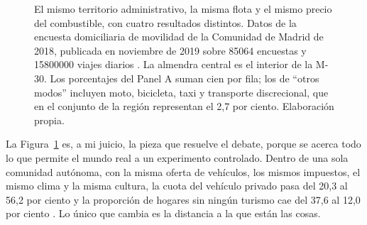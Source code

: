 \documentclass[11pt,letterpaper]{article}
\begin{document}
\begin{figure}[ht]
  \caption{El mismo territorio administrativo, la misma flota y el mismo
  precio del combustible, con cuatro resultados distintos. Datos de la encuesta
  domiciliaria de movilidad de la Comunidad de Madrid de 2018, publicada en
  noviembre de 2019 sobre \num{85064} encuestas y \num{15800000} viajes diarios
  \parencite{crtm2019}. La almendra central es el interior de la M-30. Los
  porcentajes del Panel A suman cien por fila; los de \enquote{otros modos}
  incluyen moto, bicicleta, taxi y transporte discrecional, que en el conjunto
  de la región representan el 2,7 por ciento. Elaboración propia.}
  \label{fig:madrid}
\end{figure}

La Figura~\ref{fig:madrid} es, a mi juicio, la pieza que resuelve el debate,
porque se acerca todo lo que permite el mundo real a un experimento
controlado. Dentro de una sola comunidad autónoma, con la misma oferta de
vehículos, los mismos impuestos, el mismo clima y la misma cultura, la cuota
del vehículo privado pasa del 20,3 al 56,2 por ciento y la proporción de
hogares sin ningún turismo cae del 37,6 al 12,0 por ciento
\parencite{crtm2019}. Lo único que cambia es la distancia a la que están las
cosas.
\end{document}
